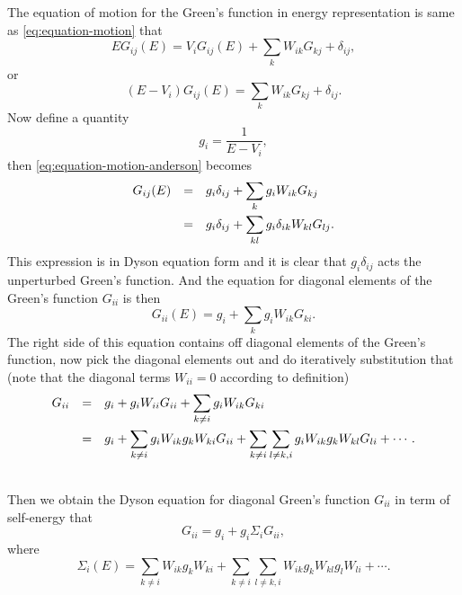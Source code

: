 \documentclass{book}
\numberwithin{equation}{section}
\begin{document}
The equation of motion for the Green's function in energy
representation is same as \eqref{eq:equation-motion} that
\begin{equation}
  \label{eq:equation-motion-anderson}
  EG_{ij}(E)=V_{i}G_{ij}(E)+\sum_kW_{ik}G_{kj}+\delta_{ij},
\end{equation}
or
\begin{equation}
  (E-V_i)G_{ij}(E)=\sum_kW_{ik}G_{kj}+\delta_{ij}.
\end{equation}
Now define a quantity
\begin{equation}
  g_i=\frac{1}{E-V_i},
\end{equation}
then \eqref{eq:equation-motion-anderson} becomes
\begin{equation}
  \begin{array}{rcl}
    G_{ij}(E)&=&\displaystyle g_i\delta_{ij}+\sum_kg_iW_{ik}G_{kj}\\\vbox to 14pt{}
    &=&\displaystyle g_i\delta_{ij}+\sum_{kl}g_i\delta_{ik}W_{kl}G_{lj}.
  \end{array}
\end{equation}
This expression is in Dyson equation form and it is clear that
$g_i\delta_{ij}$ acts the unperturbed Green's function. And the
equation for diagonal elements of the Green's function $G_{ii}$ is
then
\begin{equation}
  G_{ii}(E)=\displaystyle g_i+\sum_{k}g_iW_{ik}G_{ki}.
\end{equation}
The right side of this equation contains off diagonal elements of the
Green's function, now pick the diagonal elements out and do
iteratively substitution that (note that the diagonal terms $W_{ii}=0$
according to definition)
\begin{equation}
  \begin{array}{rcl}
    G_{ii}&=&\displaystyle g_i+g_iW_{ii}G_{ii}+\sum_{k\ne i}g_iW_{ik}G_{ki}\\\vbox to 14pt{}
    &=&\displaystyle g_i+\sum_{k\ne i}g_iW_{ik}g_kW_{ki}G_{ii}+
    \sum_{k\ne i}\sum_{l\ne k,i}g_iW_{ik}g_kW_{kl}G_{li}+\cdots.\\\vbox to 14pt{}
  \end{array}
\end{equation}
Then we obtain the Dyson equation for diagonal Green's function
$G_{ii}$ in term of self-energy that
\begin{equation}
  G_{ii}=g_i+g_i\Sigma_iG_{ii},
\end{equation}
where
\begin{equation}
  \label{eq:anderson-self-energy}
  \Sigma_i(E)=\sum_{k\ne i}W_{ik}g_kW_{ki}+\sum_{k\ne i}\sum_{l\ne k,i}W_{ik}g_kW_{kl}g_lW_{li}+\cdots.
\end{equation}
\end{document}
